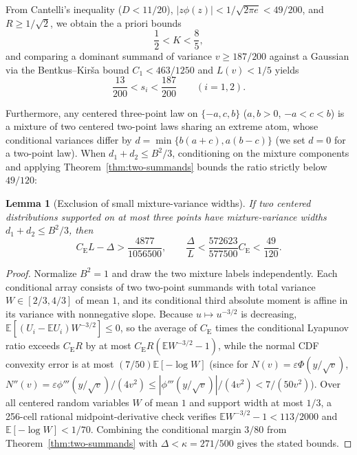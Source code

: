 \documentclass[11pt]{article}
\numberwithin{equation}{section}
\newtheorem{lemma}[theorem]{Lemma}
\theoremstyle{definition}
\theoremstyle{remark}
\newcommand{\E}{\mathbb E}
\newcommand{\be}{C_{\mathrm E}}
\begin{document}
From Cantelli's inequality ($D<11/20$), $|z\phi(z)|<1/\sqrt{2\pi e}<49/200$,
and $R\ge1/\sqrt2$, we obtain the a priori bounds
\begin{equation}\label{eq:contact-basic-collars}
 \frac12<K<\frac85,
\end{equation}
and comparing a dominant summand of variance $v\ge187/200$ against a Gaussian
via the Bentkus--Kir\v{s}a bound $C_1<463/1250$ and $L(v)<1/5$ yields
\begin{equation}\label{eq:contact-variance-collar}
 \frac{13}{200}<s_i<\frac{187}{200}\qquad(i=1,2).
\end{equation}

Furthermore, any centered three-point law on $\{-a,c,b\}$ ($a,b>0$,
$-a<c<b$) is a mixture of two centered two-point laws sharing an extreme
atom, whose conditional variances differ by $d=\min\{b(a+c),a(b-c)\}$ (we set
$d=0$ for a two-point law). When $d_1+d_2\le B^2/3$, conditioning on the
mixture components and applying Theorem~\ref{thm:two-summands} bounds the
ratio strictly below $49/120$:

\begin{lemma}[Exclusion of small mixture-variance widths]\label{lem:mixture-width}
If two centered distributions supported on at most three points have
mixture-variance widths $d_1+d_2\le B^2/3$, then
\[
 \be L-\Delta>\frac{4877}{1056500},\qquad
 \frac{\Delta}{L}<\frac{572623}{577500}\be<\frac{49}{120}.
\]
\end{lemma}
\begin{proof}
Normalize $B^2=1$ and draw the two mixture labels independently. Each
conditional array consists of two two-point summands with total variance
$W\in[2/3,4/3]$ of mean $1$, and its conditional third absolute moment is
affine in its variance with nonnegative slope. Because $u\mapsto u^{-3/2}$ is
decreasing, $\E[(U_i-\E U_i)W^{-3/2}]\le0$, so the average of $\be$ times the
conditional Lyapunov ratio exceeds $\be R$ by at most $\be R(\E W^{-3/2}-1)$,
while the normal CDF convexity error is at most $(7/50)\E[-\log W]$ (since for
$N(v)=\varepsilon\Phi(y/\sqrt v)$,
$N''(v)=\varepsilon\phi'''(y/\sqrt v)/(4v^2)\le|\phi'''(y/\sqrt v)|/(4v^2)<7/(50v^2)$). Over
all centered random variables $W$ of mean $1$ and support width at most $1/3$,
a 256-cell rational midpoint-derivative check verifies $\E W^{-3/2}-1<113/2000$
and $\E[-\log W]<1/70$. Combining the conditional margin $3/80$ from
Theorem~\ref{thm:two-summands} with $\Delta<\kappa=271/500$ gives the stated
bounds.
\end{proof}
\end{document}
